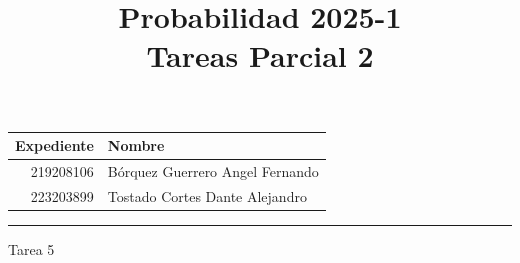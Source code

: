\documentclass[a4paper, 12pt]{article}
\title
{
  Probabilidad 2025-1 \\
  Tareas Parcial 2
}
\begin{document}
\maketitle

\begin{center}
    \begin{tabular}{r|l}
        \textbf{Expediente} & \textbf{Nombre} \\ \hline
        219208106 & Bórquez Guerrero Angel Fernando \\
        223203899 & Tostado Cortes Dante Alejandro \\
    \end{tabular}
\end{center}

\rule{\linewidth}{0.3mm}



\vspace{0.3cm}

\begin{center}
    { \LARGE Tarea 5}
\end{center}
\end{document}
